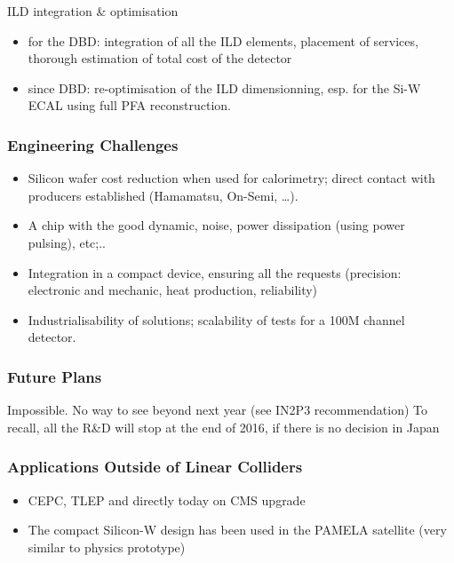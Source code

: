 ILD integration \& optimisation
\begin{itemize}
	\item for the DBD: integration of all the ILD elements, placement of services, thorough estimation of total cost of the detector
	\item since DBD: re-optimisation of the ILD dimensionning, esp. for the Si-W ECAL using full PFA reconstruction.
\end{itemize}

\subsubsection{Engineering Challenges}
\begin{itemize}
	\item Silicon wafer cost reduction when used for calorimetry; direct contact with producers established (Hamamatsu, On-Semi, …).
	\item A chip with the good dynamic, noise, power dissipation (using power pulsing), etc;..
	\item Integration in a compact device, ensuring all the requests (precision: electronic and mechanic, heat production, reliability)
	\item Industrialisability of solutions; scalability of tests for a 100M channel detector.
\end{itemize}
\subsubsection{Future Plans}
Impossible. No way to see beyond next year (see IN2P3 recommendation)
To recall, all the R\&D will stop at the end of 2016, if there is no decision in Japan
\subsubsection{Applications Outside of Linear Colliders}
\begin{itemize}
	\item CEPC, TLEP and directly today on CMS upgrade
	\item The compact Silicon-W design has been used in the PAMELA satellite (very similar to physics prototype)
\end{itemize}
